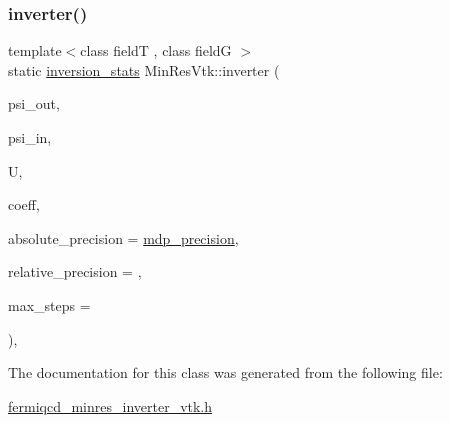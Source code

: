 \subsubsection{\texorpdfstring{inverter()}{inverter()}}
{\footnotesize\ttfamily template$<$class fieldT , class fieldG $>$ \\
static \hyperlink{classinversion__stats}{inversion\+\_\+stats} Min\+Res\+Vtk\+::inverter (\begin{DoxyParamCaption}\item[{fieldT \&}]{psi\+\_\+out,  }\item[{fieldT \&}]{psi\+\_\+in,  }\item[{fieldG \&}]{U,  }\item[{\hyperlink{classcoefficients}{coefficients} \&}]{coeff,  }\item[{\hyperlink{mdp__global__vars_8h_a69d96b74c791e0bbdb888b3913a69450}{mdp\+\_\+real}}]{absolute\+\_\+precision = {\ttfamily \hyperlink{mdp__global__vars_8h_a443a4ca745298420893e113a7ac926a9}{mdp\+\_\+precision}},  }\item[{\hyperlink{mdp__global__vars_8h_a69d96b74c791e0bbdb888b3913a69450}{mdp\+\_\+real}}]{relative\+\_\+precision = {},  }\item[{int}]{max\+\_\+steps = {} }\end{DoxyParamCaption})\hspace{0.3cm}{\ttfamily [inline]}, {\ttfamily [static]}}



The documentation for this class was generated from the following file\+:\begin{DoxyCompactItemize}
\item 
\hyperlink{fermiqcd__minres__inverter__vtk_8h}{fermiqcd\+\_\+minres\+\_\+inverter\+\_\+vtk.\+h}\end{DoxyCompactItemize}

